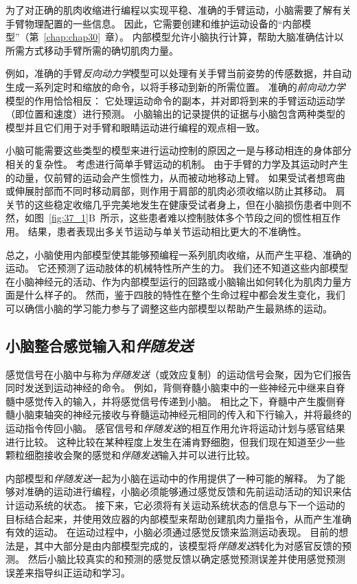 为了对正确的肌肉收缩进行编程以实现平稳、准确的手臂运动，小脑需要了解有关手臂物理配置的一些信息。
因此，它需要创建和维护运动设备的“内部模型”（第~\ref{chap:chap30}~章）。
内部模型允许小脑执行计算，帮助大脑准确估计以所需方式移动手臂所需的确切肌肉力量。


例如，准确的手臂\textit{反向动力学}模型可以处理有关手臂当前姿势的传感数据，并自动生成一系列定时和缩放的命令，以将手移动到新的所需位置。
准确的\textit{前向动力学}模型的作用恰恰相反：
它处理运动命令的副本，并对即将到来的手臂运动运动学（即位置和速度）进行预测。
小脑输出的记录提供的证据与小脑包含两种类型的模型并且它们用于对手臂和眼睛运动进行编程的观点相一致。


小脑可能需要这些类型的模型来进行运动控制的原因之一是与移动相连的身体部分相关的复杂性。
考虑进行简单手臂运动的机制。
由于手臂的力学及其运动时产生的动量，仅前臂的运动会产生惯性力，从而被动地移动上臂。
如果受试者想弯曲或伸展肘部而不同时移动肩部，则作用于肩部的肌肉必须收缩以防止其移动。
肩关节的这些稳定收缩几乎完美地发生在健康受试者身上，但在小脑损伤患者中则不然，如图~\ref{fig:37_1}B~所示，这些患者难以控制肢体多个节段之间的惯性相互作用。
结果，患者表现出多关节运动与单关节运动相比更大的不准确性。


总之，小脑使用内部模型使其能够预编程一系列肌肉收缩，从而产生平稳、准确的运动。
它还预测了运动肢体的机械特性所产生的力。 我们还不知道这些内部模型在小脑神经元的活动、作为内部模型运行的回路或小脑输出如何转化为肌肉力量方面是什么样子的。
然而，鉴于四肢的特性在整个生命过程中都会发生变化，我们可以确信小脑的学习能力参与了调整这些内部模型以帮助产生最熟练的运动。



\subsection{小脑整合感觉输入和\textit{伴随发送}}

感觉信号在小脑中与称为\textit{伴随发送}（或效应复制）的运动信号会聚，因为它们报告同时发送到运动神经的命令。
例如，背侧脊髓小脑束中的一些神经元中继来自脊髓中感觉传入的输入，并将感觉信号传递到小脑。
相比之下，脊髓中产生腹侧脊髓小脑束轴突的神经元接收与脊髓运动神经元相同的传入和下行输入，并将最终的运动指令传回小脑。
感官信号和\textit{伴随发送}的相互作用允许将运动计划与感官结果进行比较。
这种比较在某种程度上发生在浦肯野细胞，但我们现在知道至少一些颗粒细胞接收会聚的感觉和\textit{伴随发送}输入并可以进行比较。


内部模型和\textit{伴随发送}一起为小脑在运动中的作用提供了一种可能的解释。
为了能够对准确的运动进行编程，小脑必须能够通过感觉反馈和先前运动活动的知识来估计运动系统的状态。
接下来，它必须将有关运动系统状态的信息与下一个运动的目标结合起来，并使用效应器的内部模型来帮助创建肌肉力量指令，从而产生准确有效的运动。
在运动过程中，小脑必须通过感觉反馈来监测运动表现。
目前的想法是，其中大部分是由内部模型完成的，该模型将\textit{伴随发送}转化为对感官反馈的预测。
然后小脑比较真实的和预测的感觉反馈以确定感觉预测误差并使用感觉预测误差来指导纠正运动和学习。


